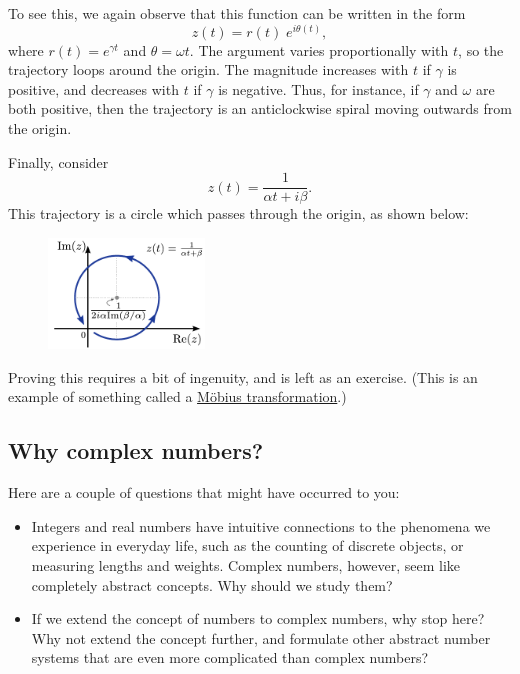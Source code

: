 \documentclass[10pt,a4paper]{article}
\begin{document}
To see this, we again observe that this function can be written in the
form
\begin{equation}
z(t) = r(t) \;e^{i\theta(t)},
\end{equation}
where $r(t) = e^{\gamma t}$ and $\theta = \omega t.$ The argument
varies proportionally with $t$, so the trajectory loops around the
origin. The magnitude increases with $t$ if $\gamma$ is positive, and
decreases with $t$ if $\gamma$ is negative. Thus, for instance, if
$\gamma$ and $\omega$ are both positive, then the trajectory is an
anticlockwise spiral moving outwards from the origin.

Finally, consider
\begin{equation}
z(t) = \frac{1}{\alpha t + i\beta}.
\end{equation}
This trajectory is a circle which passes through the origin, as shown
below:

\begin{figure}[h]
  \centering\includegraphics[width=0.37\textwidth]{complex_trajectory_3}
\end{figure}

\noindent
Proving this requires a bit of ingenuity, and is left as an
exercise. (This is an example of something called a
\href{http://en.wikipedia.org/wiki/M\%C3\%B6bius_transformation}{Möbius
  transformation}.)

\subsection{Why complex numbers?}
\label{why-complex-numbers}

Here are a couple of questions that might have occurred to you:

\begin{itemize}
\item
  Integers and real numbers have intuitive connections to the phenomena
  we experience in everyday life, such as the counting of discrete
  objects, or measuring lengths and weights. Complex numbers, however,
  seem like completely abstract concepts. Why should we study them?
\item
  If we extend the concept of numbers to complex numbers, why stop here?
  Why not extend the concept further, and formulate other abstract
  number systems that are even more complicated than complex numbers?
\end{itemize}
\end{document}
